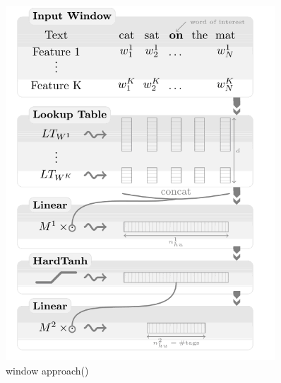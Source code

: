 \begin{figure}[H]
\centering
\begin{minipage}{.5\textwidth}
 
	\includegraphics[width=0.9\textwidth]{cw1} 
	\caption{window approach(\cite{collobert2011natural})}
	\label{fig:cw1}
\end{minipage}%
\begin{minipage}{.5\textwidth}
  

\end{minipage}
\end{figure}
